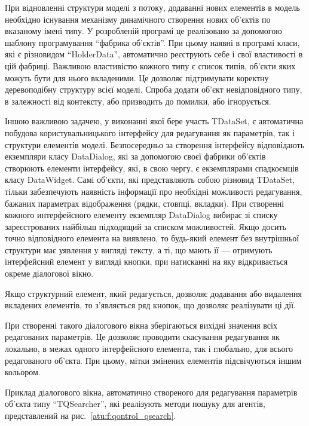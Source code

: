 При відновленні структури моделі з потоку, додаванні
нових елементів в модель необхідно існування механізму динамічного
створення нових об'єктів по вказаному імені типу. У розробленій програмі
це реалізовано за допомогою шаблону програмування ``фабрика об'єктів''.
При цьому наявні в програмі класи, які є різновидом
``HolderData'', автоматично реєструють себе і свої властивості
в цій фабриці. Важливою властивістю кожного типу є список
типів, об'єкти яких можуть бути для нього вкладеними. Це
дозволяє підтримувати коректну деревоподібну структуру всієї
моделі. Спроба додати об'єкт невідповідного типу, в залежності
від контексту, або призводить до помилки, або ігнорується.

Іншою важливою задачею, у виконанні якої бере участь TDataSet,
є автоматична побудова користувальницького інтерфейсу
для редагування як параметрів, так і структури елементів
моделі. Безпосередньо за створення інтерфейсу відповідають
екземпляри класу DataDialog, які за допомогою своєї фабрики об'єктів
створюють елементи інтерфейсу, які, в свою чергу, є екземплярами
спадкоємців класу DataWidget. Самі об'єкти, які представляють собою
різновид TDataSet, тільки забезпечують наявність інформації про необхідні
можливості редагування, бажаних параметрах відображення
(рядки, стовпці, вкладки). При створенні кожного интерфейсного
елементу екземпляр DataDialog вибирає зі списку зареєстрованих
найбільш підходящий за списком можливостей. Якщо досить точно
відповідного елемента на виявлено, то будь-який елемент без
внутрішньої структури має уявлення у вигляді тексту, а ті, що мають її
--- отримують інтерфейсний елемент у вигляді кнопки, при натисканні
на яку відкривається окреме діалогової вікно.

Якщо структурний елемент, який редагується, дозволяє додавання
або видалення вкладених елементів, то з'являється ряд кнопок,
що дозволяє реалізувати ці дії.

При створенні такого діалогового вікна зберігаються
вихідні значення всіх редагованих параметрів. Це дозволяє
проводити скасування редагування як локально, в межах одного
інтерфейсного елемента, так і глобально, для всього редагованого
об'єкта. При цьому, мітки змінених елементів підсвічуються
іншим кольором.

Приклад діалогового вікна, автоматично створеного для
редагування параметрів об'єкта типу ``TQSearcher'', які реалізують
методи пошуку для агентів, представлений на рис.~\ref{atu:f:qontrol_qsearch}.

